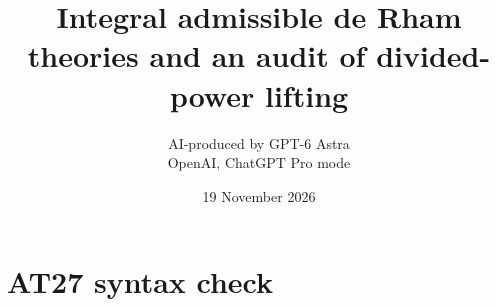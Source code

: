 \documentclass[11pt,a4paper]{article}
\title{Integral admissible de Rham theories and an audit of divided-power lifting}
\author{AI-produced by GPT-6 Astra\\OpenAI, ChatGPT Pro mode}
\date{19 November 2026}
\theoremstyle{definition}
\begin{document}
\section{AT27 syntax check}

\end{document}
